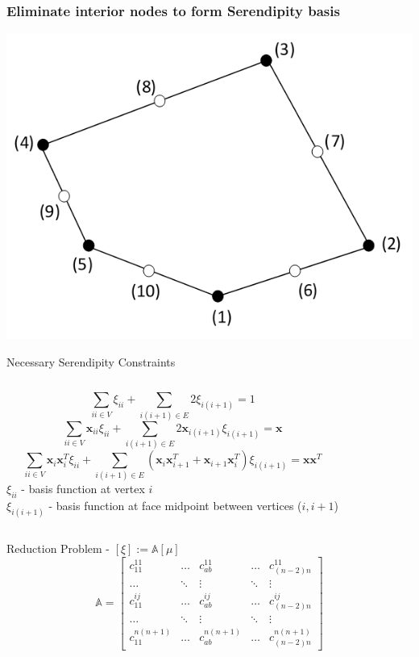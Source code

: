 \documentclass[compress,10pt]{beamer}
\renewcommand{\vec}[1]{\mathbf{#1}}
\begin{document}
\begin{frame}[t]\frametitle{\small Eliminate interior nodes to form Serendipity basis}
{
\centering
{}\includegraphics[width=0.75\columnwidth]{images/rand_ser_numbering.png} 
}
{
\begin{block}{Necessary Serendipity Constraints}{\small
\begin{columns}
\begin{equation*}
\sum_{ii \in V} \xi_{ii} + \sum_{i(i+1) \in E} 2 \xi_{i(i+1)} = 1
\end{equation*}
\begin{equation*}
\sum_{ii \in V} \vec{x}_{ii} \xi_{ii} + \sum_{i(i+1) \in E} 2 \vec{x}_{i(i+1)} \xi_{i(i+1)} = \vec{x}
\end{equation*}
\begin{equation*}
\sum_{ii \in V} \vec{x}_{i} \vec{x}_{i}^T \xi_{ii} + \sum_{i(i+1) \in E} \left(  \vec{x}_{i} \vec{x}_{i+1}^T + \vec{x}_{i+1} \vec{x}_{i}^T  \right) \xi_{i(i+1)} = \vec{x} \vec{x}^{T}
\end{equation*}
$\xi_{ii}$ - basis function at vertex $i$\\ \vspace{1mm}
$\xi_{i(i+1)}$ - basis function at face midpoint between vertices ($i, i+1$)
\end{columns}
}\end{block}
\begin{block}{Reduction Problem - $\left[ \xi \right] := \mathbb{A}  \left[ \mu \right]$}{\small
\begin{equation*}
\mathbb{A} = 
\left[
\begin{array}{ccccc}
c_{11}^{11} & \ldots & c_{ab}^{11} & \ldots & c_{(n-2)n}^{11} \\
\ldots&\ddots&\vdots&\ddots&\vdots \\
c_{11}^{ij} & \ldots & c_{ab}^{ij} & \ldots & c_{(n-2)n}^{ij} \\
\ldots&\ddots&\vdots&\ddots&\vdots \\
c_{11}^{n(n+1)} & \ldots & c_{ab}^{n(n+1)} & \ldots & c_{(n-2)n}^{n(n+1)} 
\end{array}
\right]
\end{equation*}
}\end{block}
}
\end{frame}
\end{document}
